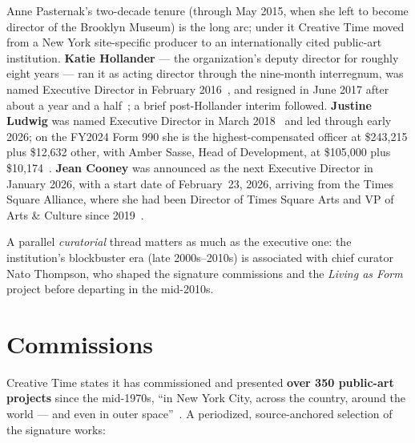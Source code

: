 \documentclass[10pt,letterpaper,twocolumn]{article}
\begin{document}
Anne Pasternak's two-decade tenure (through May 2015, when she left to become director of the Brooklyn Museum) is the long arc; under it Creative Time moved from a New York site-specific producer to an internationally cited public-art institution. \textbf{Katie Hollander} --- the organization's deputy director for roughly eight years --- ran it as acting director through the nine-month interregnum, was named Executive Director in February 2016~\citep{cthollander2016}, and resigned in June 2017 after about a year and a half~\citep{cthollander2017}; a brief post-Hollander interim followed. \textbf{Justine Ludwig} was named Executive Director in March 2018~\citep{ctludwig2018} and led through early 2026; on the FY2024 Form 990 she is the highest-compensated officer at \$243,215 plus \$12,632 other, with Amber Sasse, Head of Development, at \$105,000 plus \$10,174~\citep{ctpropublica}. \textbf{Jean Cooney} was announced as the next Executive Director in January 2026, with a start date of February~23, 2026, arriving from the Times Square Alliance, where she had been Director of Times Square Arts and VP of Arts \& Culture since 2019~\citep{ctcooney2026}.

A parallel \emph{curatorial} thread matters as much as the executive one: the institution's blockbuster era (late 2000s--2010s) is associated with chief curator Nato Thompson, who shaped the signature commissions and the \emph{Living as Form} project before departing in the mid-2010s.

\section{Commissions}

Creative Time states it has commissioned and presented \textbf{over 350 public-art projects} since the mid-1970s, ``in New York City, across the country, around the world --- and even in outer space''~\citep{ctabout}. A periodized, source-anchored selection of the signature works:
\end{document}
